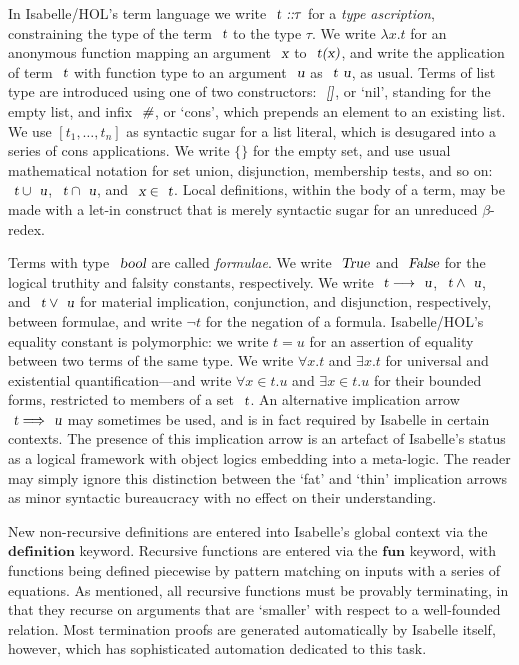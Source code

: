 \documentclass[acmlarge,review,anonymous]{acmart}\settopmatter{printfolios=true}
\begin{document}
In Isabelle/HOL's term language we write $\isa{t} \isa{::} \tau$ for a \emph{type ascription}, constraining the type of the term $\isa{t}$ to the type $\tau$.
We write $\lambda{x}. t$ for an anonymous function mapping an argument $\isa{x}$ to $\isa{t(x)}$, and write the application of term $\isa{t}$ with function type to an argument $\isa{u}$ as $\isa{t\ u}$, as usual.
Terms of list type are introduced using one of two constructors: $\isa{[]}$, or `nil', standing for the empty list, and infix $\isa{\#}$, or `cons', which prepends an element to an existing list.
We use $[t_1, \ldots, t_n]$ as syntactic sugar for a list literal, which is desugared into a series of cons applications.
We write $\{\}$ for the empty set, and use usual mathematical notation for set union, disjunction, membership tests, and so on: $\isa{t} \cup \isa{u}$, $\isa{t} \cap \isa{u}$, and $\isa{x} \in \isa{t}$.
Local definitions, within the body of a term, may be made with a let-in construct that is merely syntactic sugar for an unreduced $\beta$-redex.

Terms with type $\isa{bool}$ are called \emph{formulae}.
We write $\isa{True}$ and $\isa{False}$ for the logical truthity and falsity constants, respectively.
We write $\isa{t} \longrightarrow \isa{u}$, $\isa{t} \wedge \isa{u}$, and $\isa{t} \vee \isa{u}$ for material implication, conjunction, and disjunction, respectively, between formulae, and write $\neg t$ for the negation of a formula.
Isabelle/HOL's equality constant is polymorphic: we write $t = u$ for an assertion of equality between two terms of the same type.
We write $\forall{x}.t$ and $\exists{x}.t$ for universal and existential quantification---and write $\forall{x{\in}t}.u$ and $\exists{x{\in}t}.u$ for their bounded forms, restricted to members of a set $\isa{t}$.
An alternative implication arrow $\isa{t} \Longrightarrow \isa{u}$ may sometimes be used, and is in fact required by Isabelle in certain contexts.
The presence of this implication arrow is an artefact of Isabelle's status as a logical framework with object logics embedding into a meta-logic.
The reader may simply ignore this distinction between the `fat' and `thin' implication arrows as minor syntactic bureaucracy with no effect on their understanding.

New non-recursive definitions are entered into Isabelle's global context via the $\mathbf{definition}$ keyword.
Recursive functions are entered via the $\mathbf{fun}$ keyword, with functions being defined piecewise by pattern matching on inputs with a series of equations.
As mentioned, all recursive functions must be provably terminating, in that they recurse on arguments that are `smaller' with respect to a well-founded relation.
Most termination proofs are generated automatically by Isabelle itself, however, which has sophisticated automation dedicated to this task.
\end{document}
